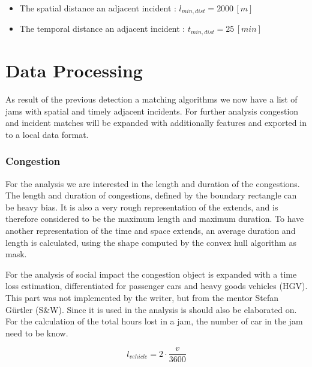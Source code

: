 \begin{itemize}
	\item The spatial distance an adjacent incident : $l_{min,dist} = 2000 \, [m]$
	\item The temporal distance an adjacent incident : $t_{min,dist} = 25 \, [min]$
\end{itemize}

\section{Data Processing}
\label{methodology_data_processing}
As result of the previous detection a matching algorithms we now have a list of jams with spatial and timely adjacent incidents. For further analysis congestion and incident matches will be expanded with additionally features and exported in to a local data format.

\subsubsection{Congestion}
For the analysis we are interested in the length and duration of the congestions. The length and duration of congestions, defined by the boundary rectangle can be heavy bias. It is also a very rough representation of the extends, and is therefore considered to be the maximum length and maximum duration. To have another representation of the time and space extends, an average duration and length is calculated, using the shape computed by the convex hull algorithm as mask.

For the analysis of social impact the congestion object is expanded with a time loss estimation, differentiated for passenger cars and heavy goods vehicles (HGV). This part was not implemented by the writer, but from the mentor Stefan Gürtler (S\&W). Since it is used in the analysis is should also be elaborated on. For the calculation of the total hours lost in a jam, the number of car in the jam need to be know.



\begin{equation}
	l_{vehicle} = 2 \cdot \frac{v}{3600}
\end{equation}


